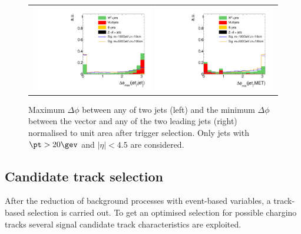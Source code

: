 \begin{figure}[!t]
  \centering 
  \begin{tabular}{c}
    \includegraphics[width=0.49\textwidth]{figures/analysis/AnalysisSelection/chiTrackstriggerRequirementsTrigger_2Signals_FullBkg/hDeltaPhiMaxbeforeCut_lin.pdf}
    \includegraphics[width=0.49\textwidth]{figures/analysis/AnalysisSelection/chiTrackstriggerRequirementsTrigger_2Signals_FullBkg/hDeltaPhiJetMetMinbeforeCut_lin.pdf}
  \end{tabular}
  \caption{Maximum $\Delta \phi$ between any of two jets (left) and the minimum $\Delta \phi$  between the \met vector and any of the two leading jets (right) normalised to unit area after trigger selection.
           Only jets with $\pt>20\gev$ and $|\eta|<4.5$ are considered.}
  \label{fig:QCDcuts}
\end{figure}
\hspace{0.9cm}

\subsection{Candidate track selection}
\label{sec:CandidateTrackSelection}
After the reduction of background processes with event-based variables, a track-based selection is carried out.
To get an optimised selection for possible chargino tracks several signal candidate track characteristics are exploited.\\

